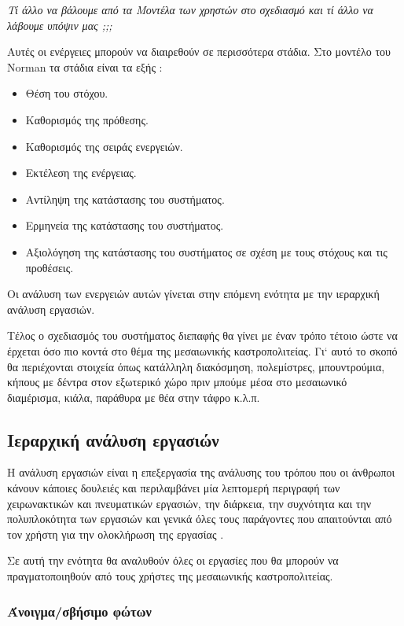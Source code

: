 \documentclass{assignment}
\begin{document}
\emph{Τί άλλο να βάλουμε από τα Μοντέλα των χρηστών στο σχεδιασμό και τί άλλο να λάβουμε υπόψιν μας ;;;}

Αυτές οι ενέργειες μπορούν να διαιρεθούν σε περισσότερα στάδια. Στο μοντέλο του Norman τα στάδια είναι τα εξής \cite{class_notes}:
\begin{itemize}
\item Θέση του στόχου.
\item Καθορισμός της πρόθεσης.
\item Καθορισμός της σειράς ενεργειών.
\item Εκτέλεση της ενέργειας.
\item Αντίληψη της κατάστασης του συστήματος.
\item Ερμηνεία της κατάστασης του συστήματος.
\item Αξιολόγηση της κατάστασης του συστήματος σε σχέση με τους στόχους και τις προθέσεις.
\end{itemize}

Οι ανάλυση των ενεργειών αυτών γίνεται στην επόμενη ενότητα με την ιεραρχική ανάλυση εργασιών. 

Τέλος ο σχεδιασμός του συστήματος διεπαφής θα γίνει με έναν τρόπο τέτοιο ώστε να έρχεται όσο πιο κοντά στο θέμα της μεσαιωνικής καστροπολιτείας. Γι` αυτό το σκοπό θα περιέχονται στοιχεία όπως κατάλληλη διακόσμηση, πολεμίστρες, μπουντρούμια, κήπους με δέντρα στον εξωτερικό χώρο πριν μπούμε μέσα στο μεσαιωνικό διαμέρισμα, κιάλα, παράθυρα με θέα στην τάφρο κ.λ.π. 

\subsection{Ιεραρχική ανάλυση εργασιών}

Η ανάλυση εργασιών είναι η επεξεργασία της ανάλυσης του τρόπου που οι άνθρωποι κάνουν κάποιες δουλειές και περιλαμβάνει μία λεπτομερή περιγραφή των χειρωνακτικών και πνευματικών εργασιών, την διάρκεια, την συχνότητα και την πολυπλοκότητα των εργασιών και γενικά όλες τους παράγοντες που απαιτούνται από τον χρήστη για την ολοκλήρωση της εργασίας \cite{class_notes,wiki:task_analysis}.

Σε αυτή την ενότητα θα αναλυθούν όλες οι εργασίες που θα μπορούν να πραγματοποιηθούν από τους χρήστες της μεσαιωνικής καστροπολιτείας.

\subsubsection{Άνοιγμα/σβήσιμο φώτων}
\end{document}
